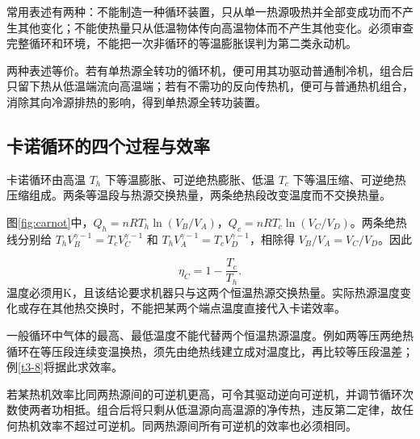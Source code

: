 常用表述有两种：不能制造一种循环装置，只从单一热源吸热并全部变成功而不产生其他变化；不能使热量只从低温物体传向高温物体而不产生其他变化。必须审查完整循环和环境，不能把一次非循环的等温膨胀误判为第二类永动机。

两种表述等价。若有单热源全转功的循环机，便可用其功驱动普通制冷机，组合后只留下热从低温端流向高温端；若有不需功的反向传热机，便可与普通热机组合，消除其向冷源排热的影响，得到单热源全转功装置。

\subsection{卡诺循环的四个过程与效率}
卡诺循环由高温 $T_h$ 下等温膨胀、可逆绝热膨胀、低温 $T_c$ 下等温压缩、可逆绝热压缩组成。两条等温段与热源交换热量，两条绝热段改变温度而不交换热量。


图\ref{fig:carnot}中，$Q_h=nRT_h\ln(V_B/V_A)$，$Q_c=nRT_c\ln(V_C/V_D)$。两条绝热线分别给 $T_hV_B^{\gamma-1}=T_cV_C^{\gamma-1}$ 和 $T_hV_A^{\gamma-1}=T_cV_D^{\gamma-1}$，相除得 $V_B/V_A=V_C/V_D$。因此

\[\boxed{\eta_C=1-\frac{T_c}{T_h}}.
\]
温度必须用K，且该结论要求机器只与这两个恒温热源交换热量。实际热源温度变化或存在其他热交换时，不能把某两个端点温度直接代入卡诺效率。

一般循环中气体的最高、最低温度不能代替两个恒温热源温度。例如两等压两绝热循环在等压段连续变温换热，须先由绝热线建立成对温度比，再比较等压段温差；例\ref{t3-8}将据此求效率。

若某热机效率比同两热源间的可逆机更高，可令其驱动逆向可逆机，并调节循环次数使两者功相抵。组合后将只剩从低温源向高温源的净传热，违反第二定律，故任何热机效率不超过可逆机。同两热源间所有可逆机的效率也必须相同。

